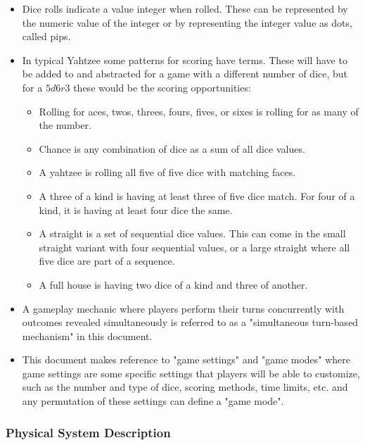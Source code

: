 \begin{itemize}
\item Dice rolls indicate a value integer when rolled. These can be represented by the numeric value of the integer or by representing the integer value as dots, called pips.

\item In typical Yahtzee some patterns for scoring have terms. These will have to be added to and abstracted for a game with a different number of dice, but for a $5d6r3$ these would be the scoring opportunities:
\begin{itemize}
	\item Rolling for aces, twos, threes, fours, fives, or sixes is rolling for as many of the number.
	\item Chance is any combination of dice as a sum of all dice values.
	\item A yahtzee is rolling all five of five dice with matching faces.
	\item A three of a kind is having at least three of five dice match. For four of a kind, it is having at least four dice the same.
	\item A straight is a set of sequential dice values. This can come in the small straight variant with four sequential values, or a large straight where all five dice are part of a sequence.
	\item A full house is having two dice of a kind and three of another.
\end{itemize}

\item A gameplay mechanic where players perform their turns concurrently with outcomes revealed simultaneously is referred to as a "simultaneous turn-based mechanism" in this document.

\item This document makes reference to "game settings" and "game modes" where game settings are some specific settings that players will be able to customize, such as the number and type of dice, scoring methods, time limits, etc. and any permutation of these settings can define a "game mode".
\end{itemize}

\iffalse
\subsubsection{Physical System Description} \label{sec_phySystDescrip}

